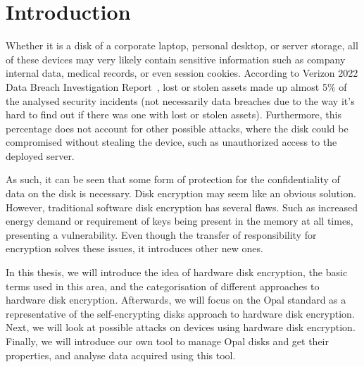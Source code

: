 
\chapter{Introduction}



Whether it is a disk of a corporate laptop, personal desktop, or server storage, all of these devices may very likely contain sensitive information such as company internal data, medical records, or even session cookies.
According to Verizon 2022 Data Breach Investigation Report~\cite{verizon_dbir}, lost or stolen assets made up almost 5\% of the analysed security incidents (not necessarily data breaches due to the way it's hard to find out if there was one with lost or stolen assets). Furthermore, this percentage does not account for other possible attacks, where the disk could be compromised without stealing the device, such as unauthorized access to the deployed server.


As such, it can be seen that some form of protection for the confidentiality of data on the disk is necessary. Disk encryption may seem like an obvious solution. However, traditional software disk encryption has several flaws. Such as increased energy demand or requirement of keys being present in the memory at all times, presenting a vulnerability.
Even though the transfer of responsibility for encryption solves these issues, it introduces other new ones.



In this thesis, we will introduce the idea of hardware disk encryption, the basic terms used in this area, and the categorisation of different approaches to hardware disk encryption. Afterwards, we will focus on the Opal standard as a representative of the self-encrypting disks approach to hardware disk encryption. Next, we will look at possible attacks on devices using hardware disk encryption. Finally, we will introduce our own tool to manage Opal disks and get their properties, and analyse data acquired using this tool.

\label{TODO}